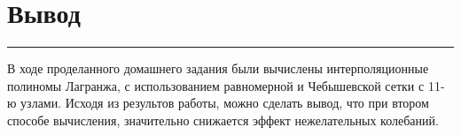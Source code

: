 \documentclass[a4paper, 14pt]{extarticle}
\begin{document}
\section*{Вывод}\vspace{-20pt}\rule{\linewidth}{0.1mm}

В ходе проделанного домашнего задания были вычислены интерполяционные полиномы Лагранжа, 
с использованием равномерной и Чебышевской сетки с 11-ю узлами. Исходя из результов работы, 
можно сделать вывод, что при втором способе вычисления, 
значительно снижается эффект нежелательных колебаний.
\end{document}
